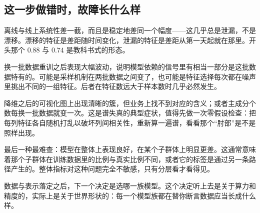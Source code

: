 \subsection{这一步做错时，故障长什么样}

离线与线上系统性差一截，而且是稳定地差同一个幅度——这几乎总是泄漏，不是漂移。漂移的特征是差距随时间变化，泄漏的特征是差距从第一天起就在那里。开头那个 \(0.88\) 与 \(0.74\) 是教科书式的形态。

换一批数据重训之后表现大幅波动，说明模型依赖的信号里有相当一部分是这批数据特有的。可能是采样机制在两批数据之间变了，也可能是特征选择每次都在噪声里挑出不同的一组特征。后者在特征数远大于样本数时几乎必然发生。

降维之后的可视化图上出现清晰的簇，但业务上找不到对应的含义；或者主成分个数每换一批数据就变一次。这是谱失真的典型症状，值得先做一次零假设检查：把每列特征各自随机打乱以破坏列间相关性，重新算一遍谱，看看那个``肘部''是不是照样出现。

最后一种最难查：模型在整体上表现良好，在某个子群体上明显更差。这通常意味着那个子群体在训练数据里的比例与真实比例不同，或者它的标签是通过另一条路径产生的。整体指标对这种问题完全不敏感，只有分层看才看得见。

数据与表示落定之后，下一个决定是选哪一族模型。这个决定听上去是关于算力和精度的，实际上是关于世界形状的：每一个模型族都在替你断言数据应当长成什么样。

